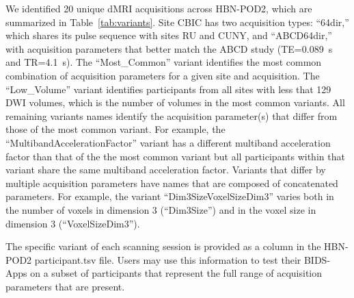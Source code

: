 \documentclass[fleqn,10pt,inline]{wlscirep}
\begin{document}
We identified 20 unique dMRI acquisitions across HBN-POD2, which are summarized in Table~\ref{tab:variants}. Site CBIC has two acquisition types: ``64dir,'' which shares its pulse sequence with sites RU and CUNY, and ``ABCD64dir,'' with acquisition parameters that better match the ABCD study (TE=\qty{0.089}{\second} and TR=\qty{4.1}{\second}). The ``Most\_Common'' variant identifies the most common combination of acquisition parameters for a given site and acquisition. The ``Low\_Volume'' variant identifies participants from all sites with less that 129 DWI volumes, which is the number of volumes in the most common variants. All remaining variants names identify the acquisition parameter(s) that differ from those of the most common variant. For example, the ``MultibandAccelerationFactor'' variant has a different multiband acceleration factor than that of the the most common variant but all participants within that variant share the same multiband acceleration factor. Variants that differ by multiple acquisition parameters have names that are composed of concatenated parameters. For example, the variant ``Dim3SizeVoxelSizeDim3'' varies both in the number of voxels in dimension 3 (``Dim3Size'') and in the voxel size in dimension 3 (``VoxelSizeDim3'').

The specific variant of each scanning session is provided as a column in the HBN-POD2 participant.tsv file. 
Users may use this information to test their BIDS-Apps on a subset of participants that represent the full range of acquisition parameters that are present.
\end{document}
